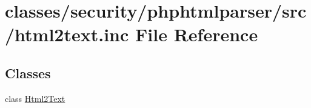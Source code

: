 \hypertarget{html2text_8inc}{\section{classes/security/phphtmlparser/src/html2text.inc File Reference}
\label{html2text_8inc}
}
\subsection*{Classes}
\begin{DoxyCompactItemize}
\item 
class \hyperlink{classHtml2Text}{Html2\+Text}
\end{DoxyCompactItemize}
